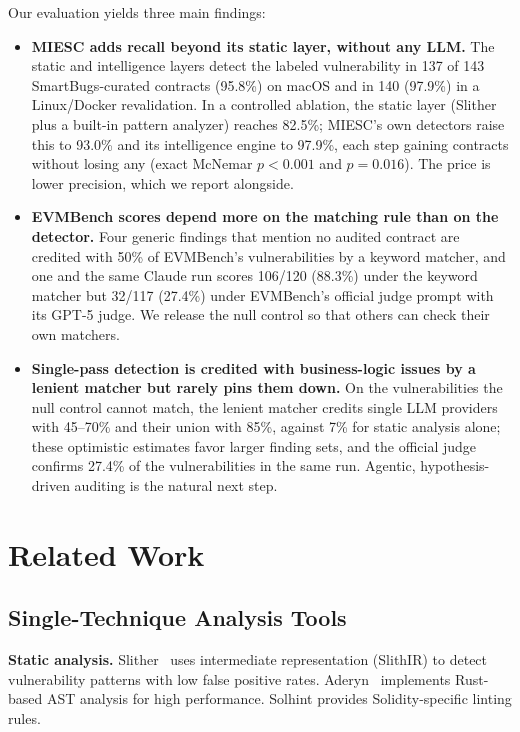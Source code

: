 \documentclass[conference]{IEEEtran}
\begin{document}
Our evaluation yields three main findings:
\begin{itemize}
    \item \textbf{MIESC adds recall beyond its static layer, without any LLM.} The static and intelligence layers detect the labeled vulnerability in 137 of 143 SmartBugs-curated contracts (95.8\%) on macOS and in 140 (97.9\%) in a Linux/Docker revalidation. In a controlled ablation, the static layer (Slither plus a built-in pattern analyzer) reaches 82.5\%; MIESC's own detectors raise this to 93.0\% and its intelligence engine to 97.9\%, each step gaining contracts without losing any (exact McNemar $p<0.001$ and $p=0.016$). The price is lower precision, which we report alongside.
    \item \textbf{EVMBench scores depend more on the matching rule than on the detector.} Four generic findings that mention no audited contract are credited with 50\% of EVMBench's vulnerabilities by a keyword matcher, and one and the same Claude run scores 106/120 (88.3\%) under the keyword matcher but 32/117 (27.4\%) under EVMBench's official judge prompt with its GPT-5 judge. We release the null control so that others can check their own matchers.
    \item \textbf{Single-pass detection is credited with business-logic issues by a lenient matcher but rarely pins them down.} On the vulnerabilities the null control cannot match, the lenient matcher credits single LLM providers with 45--70\% and their union with 85\%, against 7\% for static analysis alone; these optimistic estimates favor larger finding sets, and the official judge confirms 27.4\% of the vulnerabilities in the same run. Agentic, hypothesis-driven auditing is the natural next step.
\end{itemize}

\section{Related Work}

\subsection{Single-Technique Analysis Tools}

\textbf{Static analysis.} Slither~\cite{feist2019slither} uses intermediate representation (SlithIR) to detect vulnerability patterns with low false positive rates. Aderyn~\cite{aderyn2024} implements Rust-based AST analysis for high performance. Solhint provides Solidity-specific linting rules.
\end{document}
